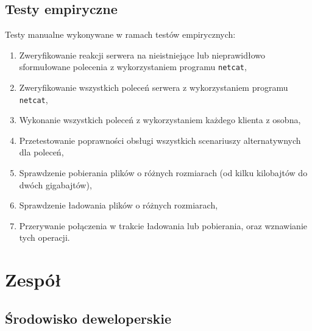 \documentclass[8pt,a4paper]{article}
\begin{document}
\subsection{Testy empiryczne}
\noindent Testy manualne wykonywane w ramach testów empirycznych:
\begin{enumerate}
    \item Zweryfikowanie reakcji serwera na nieistniejące lub nieprawidłowo sformułowane polecenia z wykorzystaniem programu \texttt{netcat},
    \item Zweryfikowanie wszystkich poleceń serwera z wykorzystaniem programu \texttt{netcat},
    \item Wykonanie wszystkich poleceń z wykorzystaniem każdego klienta z osobna,
    \item Przetestowanie poprawności obsługi wszystkich scenariuszy alternatywnych dla poleceń,
    \item Sprawdzenie pobierania plików o różnych rozmiarach (od kilku kilobajtów do dwóch gigabajtów),
    \item Sprawdzenie ładowania plików o różnych rozmiarach,
    \item Przerywanie połączenia w trakcie ładowania lub pobierania, oraz wznawianie tych operacji.
\end{enumerate}

\section{Zespół}

\subsection{Środowisko deweloperskie}
\end{document}
